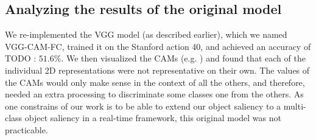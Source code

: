 \documentclass[12pt, letterpaper, twoside]{article}
\begin{document}
	\subsection{Analyzing the results of the original model}
	\label{sub:analyzing_original_model}
		We re-implemented the VGG model (as described earlier), which we named VGG-CAM-FC, trained it on the Stanford action 40, and achieved an accuracy of TODO : $51.6\%$. We then visualized the CAMs (e.g. ) and found that each of the individual 2D representations were not representative on their own. The values of the CAMs would only make sense in the context of all the others, and therefore, needed an extra processing to discriminate some classes one from the others. As one constrains of our work is to be able to extend our object saliency to a multi-class object saliency in a real-time framework, this original model was not practicable.
\end{document}
